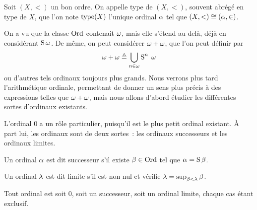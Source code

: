 \begin{definition}
  Soit $(X,<)$ un bon ordre. On appelle type de $(X,<)$, souvent abrégé en
  type de $X$, que l'on note $\operatorname{type}(X)$ l'unique ordinal $\alpha$ tel que
  $(X,<)\cong (\alpha,\in)$.
\end{definition}

On a vu que la classe $\operatorname{Ord}$ contenait $\omega$, mais elle s'étend au-delà, déjà
en considérant $\operatorname{S}\omega$. De même, on peut considérer $\omega + \omega$, que l'on peut
définir par
\[\omega + \omega \triangleq \bigcup_{n \in \omega} \operatorname{S}^n\;\omega\]
ou d'autres tels ordinaux toujours plus grands. Nous verrons plus tard
l'arithmétique ordinale, permettant de donner un sens plus précis à des
expressions telles que $\omega + \omega$, mais nous allons d'abord étudier les
différentes sortes d'ordinaux existants.

L'ordinal $0$ a un rôle particulier, puisqu'il est le plus petit ordinal
existant. \`A part lui, les ordinaux sont de deux sortes~: les ordinaux
successeurs et les ordinaux limites.

\begin{definition}
  Un ordinal $\alpha$ est dit successeur s'il existe $\beta \in \operatorname{Ord}$ tel que
  $\alpha = \operatorname{S}\beta$.
\end{definition}

\begin{definition}
  Un ordinal $\lambda$ est dit limite s'il est non nul et vérifie
  $\lambda = \sup_{\beta < \lambda} \beta$.
\end{definition}

\begin{property}
  Tout ordinal est soit $0$, soit un successeur, soit un ordinal limite, chaque
  cas étant exclusif.
\end{property}

